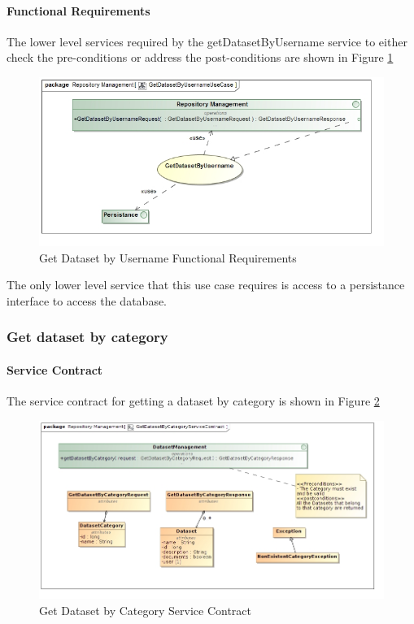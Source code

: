 \paragraph{Functional Requirements}
The lower level services required by the getDatasetByUsername service to either check the
pre-conditions or address the post-conditions are shown in Figure \ref{fig:getDatasetByUsernameUseCase}
\begin{figure}[H]
	\begin{center}
		\includegraphics[scale=0.6]{../Diagrams and Charts/Test Data/GetDatasetByUsernameUseCase.jpg}
		\caption{Get Dataset by Username Functional Requirements}
		\label{fig:getDatasetByUsernameUseCase}
	\end{center}
\end{figure}

The only lower level service that this use case requires is access to
a persistance interface to access the database.

\subsubsection {Get dataset by category}
\paragraph{Service Contract}
The service contract for getting a dataset by category is shown in Figure \ref{fig:getDatasetByCategoryService}
\begin{figure}[H]
  \begin{center}
  \includegraphics[scale=0.6]{../Diagrams and Charts/Test Data/GetDatasetByCategoryServiceContract.jpg}
  \caption{Get Dataset by Category Service Contract}
  \label{fig:getDatasetByCategoryService}
  \end{center}
  
\end{figure}

